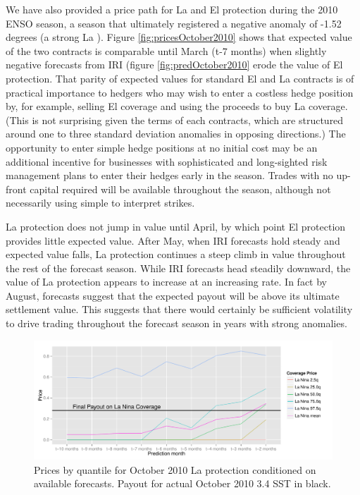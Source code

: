 \documentclass[article]{jss}
\begin{document}
We have also provided a price path for La  and El
 protection during the 2010 ENSO season, a season that
ultimately registered a negative anomaly of -1.52 degrees (a strong La
). Figure \ref{fig:pricesOctober2010} shows that expected
value of the two contracts is comparable until March (t-7 months) when
slightly negative forecasts from IRI (figure \ref{fig:predOctober2010}
erode the value of El  protection. That parity of expected
values for standard El  and La  contracts is
of practical importance to hedgers who may wish to enter a costless
hedge position by, for example, selling El  coverage and
using the proceeds to buy La  coverage. (This is not
surprising given the terms of each contracts, which are structured
around one to three standard deviation anomalies in opposing
directions.) The opportunity to enter simple hedge positions at no
initial cost may be an additional incentive for businesses with
sophisticated and long-sighted risk management plans to enter their
hedges early in the season. Trades with no up-front capital required
will be available throughout the season, although not necessarily using
simple to interpret strikes.

La  protection does not jump in value until April, by which
point El  protection provides little expected value. After
May, when IRI forecasts hold steady and expected value falls, La
 protection continues a steep climb in value throughout the
rest of the forecast season. While IRI forecasts head steadily downward,
the value of La  protection appears to increase at an
increasing rate. In fact by August, forecasts suggest that the expected
payout will be above its ultimate settlement value. This suggests that
there would certainly be sufficient volatility to drive trading
throughout the forecast season in years with strong anomalies.

\begin{figure}[!htbp]
 \begin{center}
  \includegraphics[width=\linewidth]{img/pricesOctober2010qs.pdf}
  \caption{Prices by quantile for October 2010 La  protection conditioned on available forecasts. Payout for actual October 2010  3.4 SST in black.}
   \label{fig:pricesOctober2010qs}
    \end{center}
\end{figure}
\end{document}
